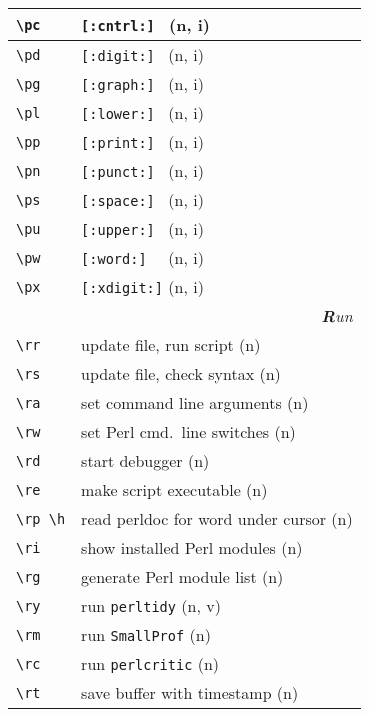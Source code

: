 \documentclass[oneside,10pt,landscape,DIV16]{scrartcl}
\begin{document}
\begin{multicols}{3}
\begin{center}
\begin{tabular}[]{|p{11mm}|p{58mm}|}
\hline \verb'\pc' &  \verb'[:cntrl:] '         \hfill (n, i)\\
\hline \verb'\pd' &  \verb'[:digit:] '         \hfill (n, i)\\
\hline \verb'\pg' &  \verb'[:graph:] '         \hfill (n, i)\\
\hline \verb'\pl' &  \verb'[:lower:] '         \hfill (n, i)\\
\hline \verb'\pp' &  \verb'[:print:] '         \hfill (n, i)\\
\hline \verb'\pn' &  \verb'[:punct:] '         \hfill (n, i)\\
\hline \verb'\ps' &  \verb'[:space:] '         \hfill (n, i)\\
\hline \verb'\pu' &  \verb'[:upper:] '         \hfill (n, i)\\
\hline \verb'\pw' &  \verb'[:word:]  '         \hfill (n, i)\\
\hline \verb'\px' &  \verb'[:xdigit:]'         \hfill (n, i)\\
\hline
\hline
\multicolumn{2}{|r|}{\textsl{\textbf{R}un}} \\
\hline \verb'\rr' & update file, run script         \hfill (n)\\
\hline \verb'\rs' & update file, check syntax       \hfill (n)\\
\hline \verb'\ra' & set command line arguments      \hfill (n)\\
\hline \verb'\rw' & set Perl cmd.\ line switches    \hfill (n)\\
\hline \verb'\rd' & start debugger                  \hfill (n)\\
\hline \verb'\re' & make script executable          \hfill (n)\\
\hline \verb'\rp \h'   & read perldoc for word under cursor     \hfill (n)  \\
\hline \verb'\ri' & show installed Perl modules     \hfill (n)\\
\hline \verb'\rg' & generate Perl module list       \hfill (n)\\
\hline \verb'\ry' & run \verb'perltidy'           \hfill (n, v)\\
\hline \verb'\rm' & run \verb'SmallProf'          \hfill (n)\\
\hline \verb'\rc' & run \verb'perlcritic'         \hfill (n)\\
\hline \verb'\rt' & save buffer with timestamp      \hfill (n)\\

\end{tabular}
\end{center}
\end{multicols}
\end{document}
